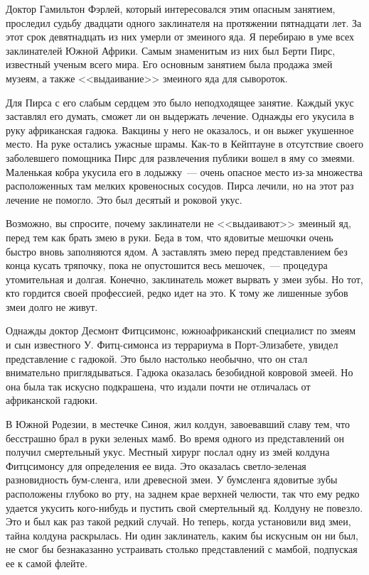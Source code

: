 \documentclass[12pt,a4paper,twoside,openany,svgnames]{memoir}
\begin{document}
Доктор Гамильтон Фэрлей, который интересовался этим опасным занятием, проследил судьбу двадцати одного заклинателя на протяжении пятнадцати лет. За этот срок девятнадцать из них умерли от змеиного яда. Я перебираю в уме всех заклинателей Южной Африки. Самым знаменитым из них был Берти Пирс, известный ученым всего мира. Его основным занятием была продажа змей музеям, а также <<выдаивание>> змеиного яда для сывороток.

Для Пирса с его слабым сердцем это было неподходящее занятие. Каждый укус заставлял его думать, сможет ли он выдержать лечение. Однажды его укусила в руку африканская гадюка. Вакцины у него не оказалось, и он выжег укушенное место. На руке остались ужасные шрамы. Как-то в Кейптауне в отсутствие своего заболевшего помощника Пирс для развлечения публики вошел в яму со змеями. Маленькая кобра укусила его в лодыжку~--- очень опасное место из-за множества расположенных там мелких кровеносных сосудов. Пирса лечили, но на этот раз лечение не помогло. Это был десятый и роковой укус.

Возможно, вы спросите, почему заклинатели не <<выдаивают>> змеиный яд, перед тем как брать змею в руки. Беда в том, что ядовитые мешочки очень быстро вновь заполняются ядом. А заставлять змею перед представлением без конца кусать тряпочку, пока не опустошится весь мешочек,~--- процедура утомительная и долгая. Конечно, заклинатель может вырвать у змеи зубы. Но тот, кто гордится своей профессией, редко идет на это. К тому же лишенные зубов змеи долго не живут.

Однажды доктор Десмонт Фитцсимонс, южноафриканский специалист по змеям и сын известного У. Фитц-симонса из террариума в Порт-Элизабете, увидел представление с гадюкой. Это было настолько необычно, что он стал внимательно приглядываться. Гадюка оказалась безобидной ковровой змеей. Но она была так искусно подкрашена, что издали почти не отличалась от африканской гадюки.

В Южной Родезии, в местечке Синоя, жил колдун, завоевавший славу тем, что бесстрашно брал в руки зеленых мамб. Во время одного из представлений он получил смертельный укус. Местный хирург послал одну из змей колдуна Фитцсимонсу для определения ее вида. Это оказалась светло-зеленая разновидность бум-сленга, или древесной змеи. У бумсленга ядовитые зубы расположены глубоко во рту, на заднем крае верхней челюсти, так что ему редко удается укусить кого-нибудь и пустить свой смертельный яд. Колдуну не повезло. Это и был как раз такой редкий случай. Но теперь, когда установили вид змеи, тайна колдуна раскрылась. Ни один заклинатель, каким бы искусным он ни был, не смог бы безнаказанно устраивать столько представлений с мамбой, подпуская ее к самой флейте.
\end{document}
